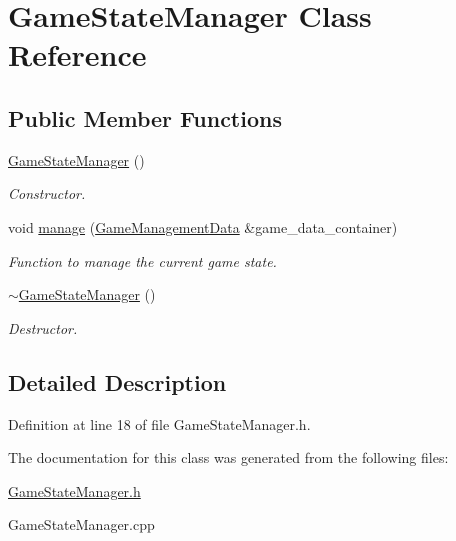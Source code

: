\hypertarget{class_game_state_manager}{\section{Game\+State\+Manager Class Reference}
\label{class_game_state_manager}
}
\subsection*{Public Member Functions}
\begin{DoxyCompactItemize}
\item 
\hypertarget{class_game_state_manager_aa9769dca27ad070cf5491a7f54c7d85e}{\hyperlink{class_game_state_manager_aa9769dca27ad070cf5491a7f54c7d85e}{Game\+State\+Manager} ()}\label{class_game_state_manager_aa9769dca27ad070cf5491a7f54c7d85e}

\begin{DoxyCompactList}\small\item\em Constructor. \end{DoxyCompactList}\item 
\hypertarget{class_game_state_manager_aa113f5c0f62142776ec8cef1bb904ff5}{void \hyperlink{class_game_state_manager_aa113f5c0f62142776ec8cef1bb904ff5}{manage} (\hyperlink{class_game_management_data}{Game\+Management\+Data} \&game\+\_\+data\+\_\+container)}\label{class_game_state_manager_aa113f5c0f62142776ec8cef1bb904ff5}

\begin{DoxyCompactList}\small\item\em Function to manage the current game state. \end{DoxyCompactList}\item 
\hypertarget{class_game_state_manager_ad20961eb5d9ed6b7ef764037d5e11ba5}{\hyperlink{class_game_state_manager_ad20961eb5d9ed6b7ef764037d5e11ba5}{$\sim$\+Game\+State\+Manager} ()}\label{class_game_state_manager_ad20961eb5d9ed6b7ef764037d5e11ba5}

\begin{DoxyCompactList}\small\item\em Destructor. \end{DoxyCompactList}\end{DoxyCompactItemize}


\subsection{Detailed Description}


Definition at line 18 of file Game\+State\+Manager.\+h.



The documentation for this class was generated from the following files\+:\begin{DoxyCompactItemize}
\item 
\hyperlink{_game_state_manager_8h}{Game\+State\+Manager.\+h}\item 
Game\+State\+Manager.\+cpp\end{DoxyCompactItemize}
